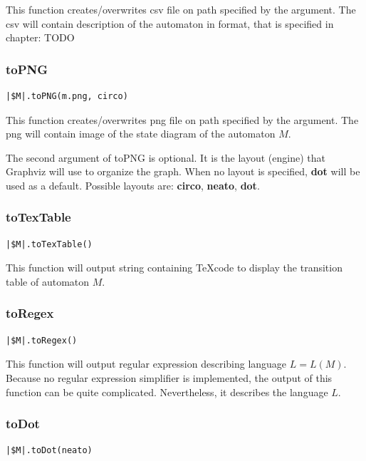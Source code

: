 \documentclass{ctuthesis}
\begin{document}
This function creates/overwrites csv file on path specified by the argument. The csv will contain description of the automaton in format, that is specified in chapter: TODO

\subsubsection{toPNG}
\begin{lstlisting}[language = JASL_snippet]
	|$M|.toPNG(m.png, circo)
\end{lstlisting}

This function creates/overwrites png file on path specified by the argument. The png will contain image of the state diagram of the automaton $M$. 

The second argument of toPNG is optional. It is the layout (engine) that Graphviz will use to organize the graph. When no layout is specified, \textbf{dot} will be used as a default. Possible layouts are: \textbf{circo}, \textbf{neato}, \textbf{dot}.

\subsubsection{toTexTable}
\begin{lstlisting}[language = JASL_snippet]
	|$M|.toTexTable()
\end{lstlisting}

This function will output string containing \TeX code to display the transition table of automaton $M$. 

\subsubsection{toRegex}
\begin{lstlisting}[language = JASL_snippet]
	|$M|.toRegex()
\end{lstlisting}

This function will output regular expression describing language $L = L(M)$. Because no regular expression simplifier is implemented, the output of this function can be quite complicated. Nevertheless, it describes the language $L$. 

\subsubsection{toDot}
\label{subsec:toDot}
\begin{lstlisting}[language = JASL_snippet]
	|$M|.toDot(neato)
\end{lstlisting}
\end{document}
